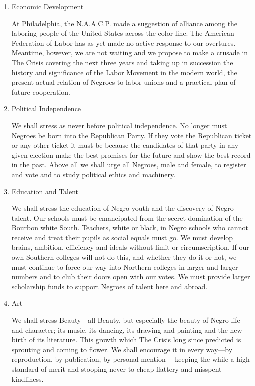 \documentclass[letterpaper,10pt,english]{jupyterBook}
\begin{document}
\begin{enumerate}
%
\item {} 
\sphinxAtStartPar
Economic Development

\sphinxAtStartPar
At Philadelphia, the N.A.A.C.P. made a suggestion of alliance among the laboring people of the United States across the color line. The American Federation of Labor has as yet made no active response to our overtures. Meantime, however, we are not waiting and we \sphinxhyphen{}propose to make a crusade in The Crisis covering the next three years and taking up in succession the history and significance of the Labor Movement in the modern world, the present actual relation of Negroes to labor unions and a practical plan of future cooperation.

\item {} 
\sphinxAtStartPar
Political Independence

\sphinxAtStartPar
We shall stress as never before political independence. No longer must Negroes be born into the Republican Party. If they vote the Republican ticket or any other ticket it must be because the candidates of that party in any given election make the best promises for the future and show the best record in the past. Above all we shall urge all Negroes, male and female, to register and vote and to study political ethics and machinery.

\item {} 
\sphinxAtStartPar
Education and Talent

\sphinxAtStartPar
We shall stress the education of Negro youth and the discovery of Negro talent. Our schools must be emancipated from the secret domination of the Bourbon white South. Teachers, white or black, in Negro schools who cannot receive and treat their pupils as social equals must go. We must develop brains, ambition, efficiency and ideals without limit or circumscription. If our own Southern colleges will not do this, and whether they do it or not, we must  continue to force our way into Northern colleges in larger and larger numbers and to club their doors open with our votes. We must provide larger scholarship funds to support Negroes of talent here and abroad.

\item {} 
\sphinxAtStartPar
Art

\sphinxAtStartPar
We shall stress Beauty—all Beauty, but especially the beauty of Negro life and character; its music, its dancing, its drawing and painting and the new birth of its literature. This growth which The Crisis long since predicted is sprouting and coming to flower. We shall encourage it in every way—by reproduction, by publication, by personal mention— keeping the while a high standard of merit and stooping never to cheap flattery and misspent kindliness.


\end{enumerate}
\end{document}
